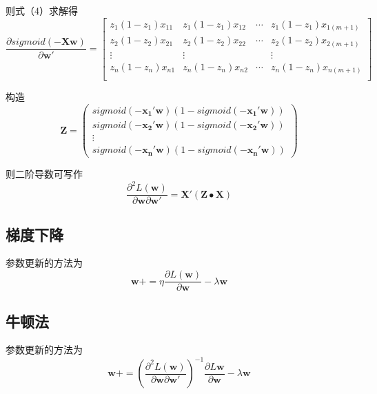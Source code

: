 \documentclass[withoutpreface,bwprint]{cumcmthesis}
\begin{document}
则式（4）求解得
\begin{equation*}
\frac{\partial{sigmoid(-\boldsymbol{Xw})}}{\partial{\boldsymbol{w'}}}=
\begin{bmatrix}
z_{1}(1-z_{1})x_{11}&z_{1}(1-z_{1})x_{12}&\cdots&z_{1}(1-z_{1})x_{1(m+1)}\\
z_{2}(1-z_{2})x_{21}&z_{2}(1-z_{2})x_{22}&\cdots&z_{2}(1-z_{2})x_{2(m+1)}\\
\vdots&\vdots& &\vdots\\
z_{n}(1-z_{n})x_{n1}&z_{n}(1-z_{n})x_{n2}&\cdots&z_{n}(1-z_{n})x_{n(m+1)}\\
\end{bmatrix}
\end{equation*}

构造
\begin{equation*}
\boldsymbol{Z}=\begin{pmatrix}
sigmoid(-\boldsymbol{x_{1}'w})(1-sigmoid(-\boldsymbol{x_{1}'w}))\\sigmoid(-\boldsymbol{x_{2}'w})(1-sigmoid(-\boldsymbol{x_{2}'w}))\\ \vdots \\sigmoid(-\boldsymbol{x_{n}'w})(1-sigmoid(-\boldsymbol{x_{n}'w}))
\end{pmatrix}
\end{equation*}

则二阶导数可写作
\begin{equation*}
\frac{\partial^{2}{L(\boldsymbol{w})}}{\partial{\boldsymbol{w}}\partial{\boldsymbol{w'}}}=\boldsymbol{X'}(\boldsymbol{Z\bullet X})
\end{equation*}

\subsection{梯度下降}
参数更新的方法为
\begin{equation*}
\boldsymbol{w}+=\eta \frac{\partial{L(\boldsymbol{w})}}{\partial{\boldsymbol{w}}} -  \lambda \boldsymbol{w}
\end{equation*}

\subsection{牛顿法}
参数更新的方法为
\begin{equation*}
\boldsymbol{w}+=(\frac{\partial^{2}{L(\boldsymbol{w})}}{\partial{\boldsymbol{w}}\partial{\boldsymbol{w'}}})^{-1}
\frac{\partial{L{\boldsymbol{w}}}}{\partial{\boldsymbol{w}}} 
-\lambda \boldsymbol{w}
\end{equation*}
\end{document}
